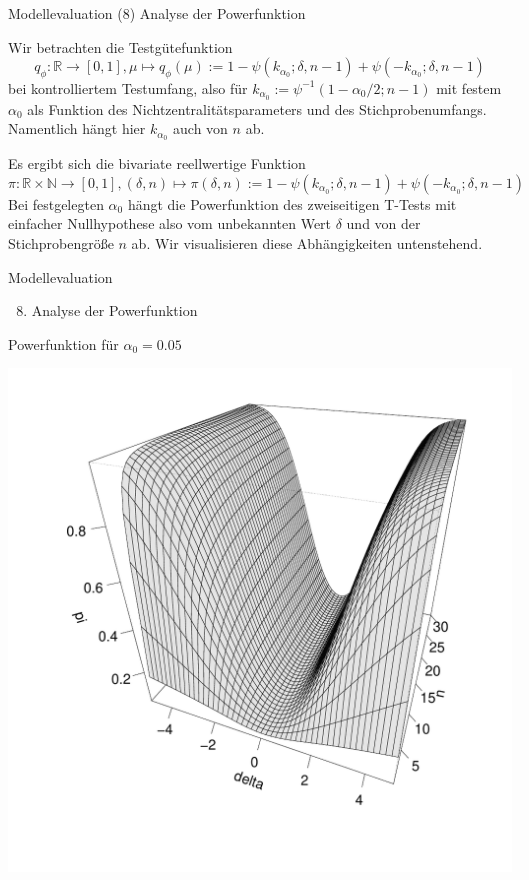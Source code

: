\documentclass[
  8pt,
  ignorenonframetext,
]{beamer}
\providecommand{\tightlist}{%
  \setlength{\itemsep}{0pt}\setlength{\parskip}{0pt}}
\begin{document}
\begin{frame}{Modellevaluation}
\protect\hypertarget{modellevaluation-19}{}
\noindent (8) Analyse der Powerfunktion \vfill \justifying

\small

Wir betrachten die Testgütefunktion \begin{equation}
q_\phi : \mathbb{R} \to [0,1],
\mu \mapsto q_\phi(\mu)
:= 1 - \psi(k_{\alpha_0}; \delta, n-1) + \psi(-k_{\alpha_0}; \delta, n-1)
\end{equation} bei kontrolliertem Testumfang, also für
\(k_{\alpha_0} := \psi^{-1}(1-\alpha_0/2;n-1)\) mit festem \(\alpha_0\)
als Funktion des Nichtzentralitätsparameters und des Stichprobenumfangs.
Namentlich hängt hier \(k_{\alpha_0}\) auch von \(n\) ab.

Es ergibt sich die bivariate reellwertige Funktion \begin{equation}
\pi : \mathbb{R} \times \mathbb{N} \to [0,1],
(\delta,n) \mapsto
\pi(\delta,n) := 1 - \psi(k_{\alpha_0}; \delta, n-1) + \psi(-k_{\alpha_0}; \delta, n-1)
\end{equation} Bei festgelegten \(\alpha_0\) hängt die Powerfunktion des
zweiseitigen T-Tests mit einfacher Nullhypothese also vom unbekannten
Wert \(\delta\) und von der Stichprobengröße \(n\) ab. Wir visualisieren
diese Abhängigkeiten untenstehend. \vfill
\end{frame}

\begin{frame}{Modellevaluation}
\protect\hypertarget{modellevaluation-20}{}
\begin{enumerate}
[(1)]
\setcounter{enumi}{7}
\tightlist
\item
  Analyse der Powerfunktion
\end{enumerate}

\small

Powerfunktion für \(\alpha_0 = 0.05\)

\begin{center}\includegraphics[width=0.6\linewidth]{9_Abbildungen/alm_9_t_test_ungerichtet_power_005} \end{center}
\end{frame}
\end{document}
